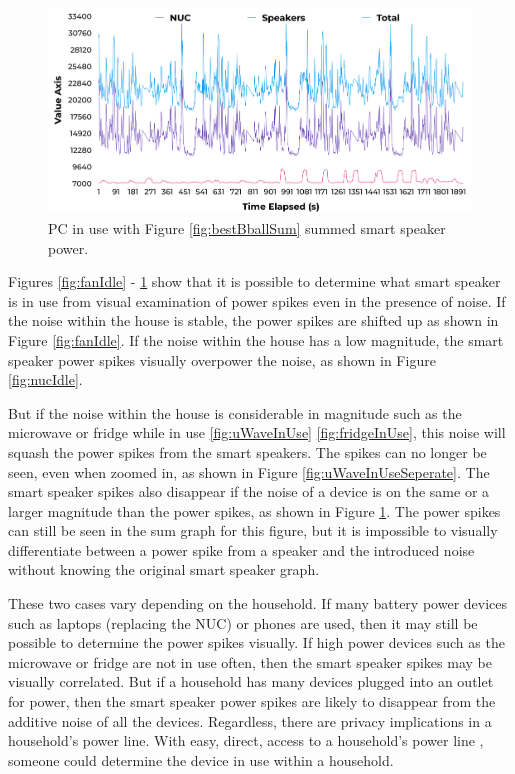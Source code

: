 \begin{figure}[H]
  \centering
  \includegraphics[width=1\textwidth]{figures/inUseNUCNoise.png}
  \caption{PC in use with Figure \ref{fig:bestBballSum} summed smart speaker power.}
  \label{fig:nucInUse}
\end{figure}

Figures \ref{fig:fanIdle} - \ref{fig:nucInUse} show that it is possible to determine what smart speaker is in use from visual examination of power spikes even in the presence of noise. If the noise within the house is stable, the power spikes are shifted up as shown in Figure \ref{fig:fanIdle}. If the noise within the house has a low magnitude, the smart speaker power spikes visually overpower the noise, as shown in Figure \ref{fig:nucIdle}.

But if the noise within the house is considerable in magnitude such as the microwave or fridge while in use \ref{fig:uWaveInUse} \ref{fig:fridgeInUse}, this noise will squash the power spikes from the smart speakers. The spikes can no longer be seen, even when zoomed in, as shown in Figure \ref{fig:uWaveInUseSeperate}. The smart speaker spikes also disappear if the noise of a device is on the same or a larger magnitude than the power spikes, as shown in Figure \ref{fig:nucInUse}. The power spikes can still be seen in the sum graph for this figure, but it is impossible to visually differentiate between a power spike from a speaker and the introduced noise without knowing the original smart speaker graph.

These two cases vary depending on the household. If many battery power devices such as laptops (replacing the NUC) or phones are used, then it may still be possible to determine the power spikes visually. If high power devices such as the microwave or fridge are not in use often, then the smart speaker spikes may be visually correlated. But if a household has many devices plugged into an outlet for power, then the smart speaker power spikes are likely to disappear from the additive noise of all the devices. Regardless, there are privacy implications in a household's power line. With easy, direct, access to a household's power line \cite{griffith_2017}, someone could determine the device in use within a household.